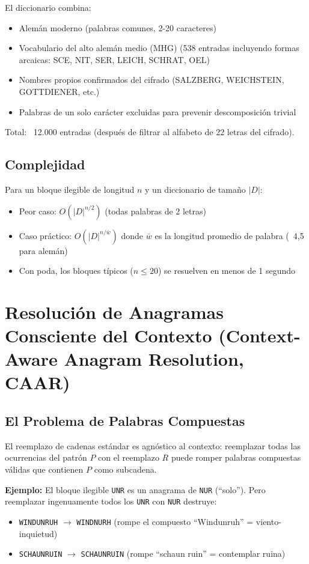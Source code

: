 \documentclass[11pt,a4paper]{article}
\begin{document}
El diccionario combina:

\begin{itemize}
\item Alemán moderno (palabras comunes, 2-20 caracteres)
\item Vocabulario del alto alemán medio (MHG) (538 entradas incluyendo formas arcaicas: SCE, NIT, SER, LEICH, SCHRAT, OEL)
\item Nombres propios confirmados del cifrado (SALZBERG, WEICHSTEIN, GOTTDIENER, etc.)
\item Palabras de un solo carácter excluidas para prevenir descomposición trivial
\end{itemize}

Total: ~12.000 entradas (después de filtrar al alfabeto de 22 letras del cifrado).

\subsection{Complejidad}

Para un bloque ilegible de longitud $n$ y un diccionario de tamaño $|D|$:

\begin{itemize}
\item Peor caso: $O(|D|^{n/2})$ (todas palabras de 2 letras)
\item Caso práctico: $O(|D|^{n/\bar{w}})$ donde $\bar{w}$ es la longitud promedio de palabra (~4,5 para alemán)
\item Con poda, los bloques típicos ($n \leq 20$) se resuelven en menos de 1 segundo
\end{itemize}

\section{Resolución de Anagramas Consciente del Contexto (Context-Aware Anagram Resolution, CAAR)}

\subsection{El Problema de Palabras Compuestas}

El reemplazo de cadenas estándar es agnóstico al contexto: reemplazar todas las ocurrencias del patrón $P$ con el reemplazo $R$ puede romper palabras compuestas válidas que contienen $P$ como subcadena.

\textbf{Ejemplo:} El bloque ilegible \texttt{UNR} es un anagrama de \texttt{NUR} (``solo''). Pero reemplazar ingenuamente todos los \texttt{UNR} con \texttt{NUR} destruye:
\begin{itemize}
\item \texttt{WINDUNRUH} $\rightarrow$ \texttt{WINDNURH} (rompe el compuesto ``Windunruh'' = viento-inquietud)
\item \texttt{SCHAUNRUIN} $\rightarrow$ \texttt{SCHAUNRUIN} (rompe ``schaun ruin'' = contemplar ruina)
\end{itemize}
\end{document}
